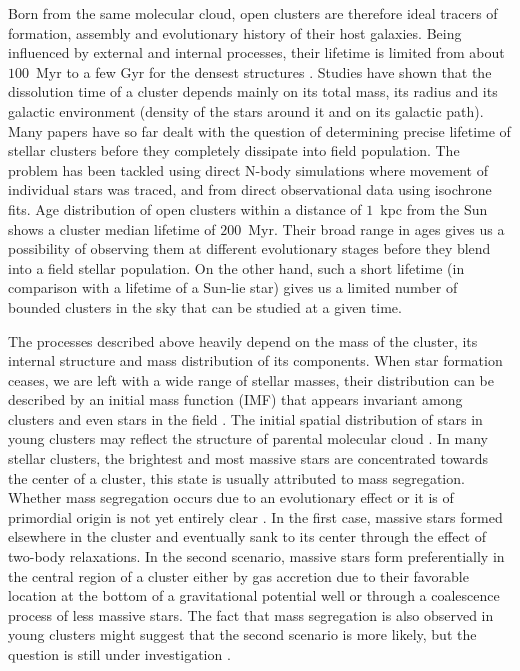 Born from the same molecular cloud, open clusters are therefore ideal tracers of formation, assembly and evolutionary history of their host galaxies. Being influenced by external and internal processes, their lifetime is limited from about $100$~Myr to a few Gyr for the densest structures \cite{1998A&A...337..363P, 2013MNRAS.434.2509M}. Studies have shown that the dissolution time of a cluster depends mainly on its total mass, its radius and its galactic environment (density of the stars around it and on its galactic path). Many papers have so far dealt with the question of determining precise lifetime of stellar clusters before they completely dissipate into field population. The problem has been tackled using direct N-body simulations \cite{1998A&A...337..363P} where movement of individual stars was traced, and from direct observational data \cite{1971Ap&SS..13..300W, 1988IAUS..126..393W, 2019MNRAS.487.2385M, 2019A&A...623A.108B} using isochrone fits. Age distribution of open clusters within a distance of $1$~kpc from the Sun shows a cluster median lifetime of $200$~Myr. Their broad range in ages gives us a possibility of observing them at different evolutionary stages \cite{2006BASI...34..153C, 2007A&A...468..139P} before they blend \cite{2001A&A...366..827B} into a field stellar population. On the other hand, such a short lifetime (in comparison with a lifetime of a Sun-lie star) gives us a limited number of bounded clusters in the sky that can be studied at a given time.

The processes described above heavily depend on the mass of the cluster, its internal structure and mass distribution of its components. When star formation ceases, we are left with a wide range of stellar masses, their distribution can be described by an initial mass function (IMF) \cite{1955ApJ...121..161S, 1986FCPh...11....1S, 2003PASP..115..763C} that appears invariant among clusters and even stars in the field \cite{2001MNRAS.322..231K}. The initial spatial distribution of stars in young clusters may reflect the structure of parental molecular cloud \cite{2015MNRAS.448.1847H}. In many stellar clusters, the brightest and most massive stars are concentrated towards the center of a cluster, this state is usually attributed to mass segregation. Whether mass segregation occurs due to an evolutionary effect or it is of primordial origin is not yet entirely clear \cite{1998A&A...333..897R, 1998MNRAS.295..691B, 2002MNRAS.331..245D, 2003A&A...405..525B}. In the first case, massive stars formed elsewhere in the cluster and eventually sank to its center through the effect of two-body relaxations. In the second scenario, massive stars form preferentially in the central region of a cluster either by gas accretion due to their favorable location at the bottom of a gravitational potential well or through a coalescence process of less massive stars. The fact that mass segregation is also observed in young clusters might suggest that the second scenario is more likely, but the question is still under investigation \cite{2018MNRAS.473..849D}.

